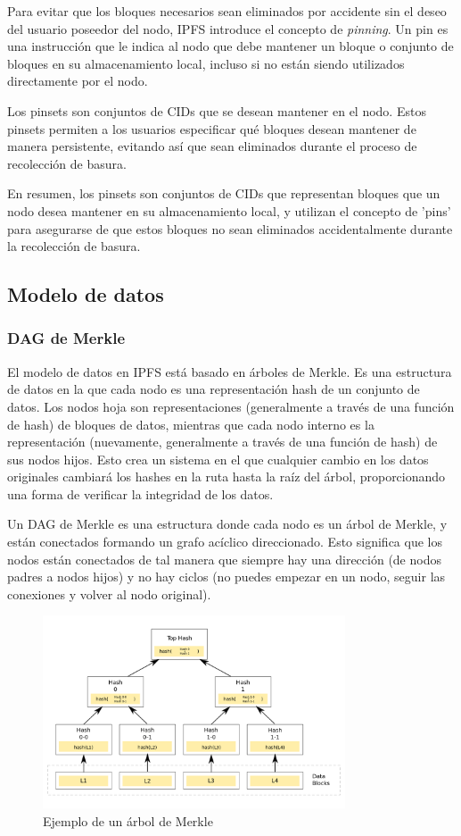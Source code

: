 Para evitar que los bloques necesarios sean eliminados por accidente sin el deseo del usuario poseedor del nodo, IPFS introduce el concepto de \textit{pinning}. Un pin es una
instrucción que le indica al nodo que debe mantener un bloque o conjunto de bloques en su almacenamiento local, incluso si no están
siendo utilizados directamente por el nodo.

Los pinsets son conjuntos de CIDs que se desean mantener en el nodo. Estos pinsets permiten a los usuarios
especificar qué bloques desean mantener de manera persistente, evitando así que sean eliminados durante el proceso de
recolección de basura.

En resumen, los pinsets son conjuntos de CIDs que representan bloques que un nodo desea mantener en su almacenamiento local, y utilizan el concepto de 'pins' para asegurarse de que estos bloques no sean eliminados accidentalmente durante la recolección de basura.

\subsection{Modelo de datos}
\subsubsection{DAG de Merkle}
El modelo de datos en IPFS está basado en árboles de Merkle. Es una estructura de datos en la que cada nodo es una representación hash de un conjunto de datos.
Los nodos hoja son representaciones (generalmente a través de una función de hash) de bloques de datos, mientras que cada nodo interno es la representación
(nuevamente, generalmente a través de una función de hash) de sus nodos hijos. Esto crea un sistema en el que cualquier cambio en los datos originales cambiará
los hashes en la ruta hasta la raíz del árbol, proporcionando una forma de verificar la integridad de los datos.

Un DAG de Merkle es una estructura donde cada nodo es un árbol de Merkle, y están conectados formando un grafo acíclico direccionado.
Esto significa que los nodos están conectados de tal manera que siempre hay una dirección (de nodos padres a nodos hijos) y no hay ciclos (no puedes empezar en un nodo, seguir las conexiones y volver al nodo original).

\begin{figure}[H]
      \centering
      \includegraphics[width=0.8\textwidth]{images/merkledag.png}
      \caption{Ejemplo de un árbol de Merkle}
      \label{merkledag}
\end{figure}


